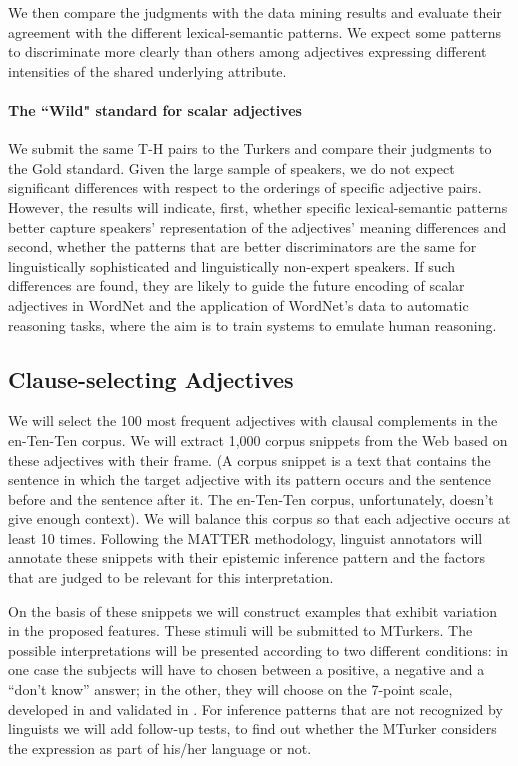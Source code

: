 \documentclass[10pt]{article}
\begin{document}
\noindent 
We then compare the judgments with the data mining results and evaluate their agreement with the different lexical-semantic patterns. 
We expect some patterns to discriminate more clearly than others among adjectives expressing different intensities of the shared underlying attribute. 

\paragraph{The ``Wild" standard for scalar adjectives}
We submit the same T-H pairs to the Turkers and compare their judgments to the Gold standard. Given the large sample 
of speakers, we do not expect significant differences with respect to the orderings of specific adjective pairs. However, 
the results will indicate, first, whether specific lexical-semantic patterns better capture speakers' representation of the adjectives' 
meaning differences and second, whether the patterns that are better discriminators are the same for linguistically 
sophisticated and linguistically non-expert speakers. If such differences are found, they are likely to guide the future encoding of scalar adjectives 
in WordNet and the application of WordNet's data to automatic reasoning tasks, where the aim is to train systems to emulate human reasoning. 

\subsection{Clause-selecting Adjectives}

We will select the 100 most frequent adjectives with clausal complements in the en-Ten-Ten corpus. We will extract 1,000 corpus snippets from the Web based on these adjectives with their frame. (A corpus snippet is a text that contains the sentence in which the target adjective with its pattern occurs and the sentence before and the sentence after it. The en-Ten-Ten corpus, unfortunately, doesn’t give enough context). We will balance this corpus so that each adjective occurs at least 10 times. Following the MATTER methodology, linguist annotators will annotate these snippets with their epistemic inference pattern and the factors that are judged to be relevant for this interpretation.

On the basis of these snippets we will construct examples that exhibit variation in the proposed features. These stimuli will be submitted to MTurkers. 
The possible interpretations will be presented according to two different conditions: in one case the subjects will have to chosen between a positive, a negative and a ``don’t know'' answer; in the other, they will choose on the 7-point scale, developed in \cite{sauri:2008phd,sauri-pustejovsky2012} and validated in \cite{demarneff+manning+potts:2012}.
For inference patterns that are not recognized by linguists we will add follow-up tests, to find out whether the MTurker considers the expression as part of his/her language or not.
\end{document}
